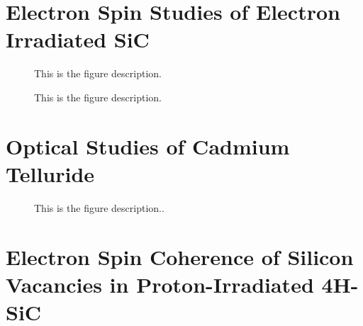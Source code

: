 \documentclass[oneside, astronomy, noacknowlegments]{BYUPhys}
\begin{document}
\begin{appendices}











\chapter{Electron Spin Studies of Electron Irradiated SiC}
\label{chpt:AppendA}

\begin{figure}
    \caption[Electron-irradiated SiC lifetime  summary]{\label{fig:e17results}
     This is the figure description.}
 \end{figure}

\begin{figure}
    \caption[ODMR/Photoluminescence vs temperature]{\label{fig:ODMRPL}
     This is the figure description.}
 \end{figure}











\chapter{Optical Studies of Cadmium Telluride}
\label{chpt:AppendB}

\begin{figure}
    \caption[Photoluminescence of CdTe]{\label{fig:CdTePL}
     This is the figure description..}
 \end{figure}









\chapter{Electron Spin Coherence of Silicon Vacancies in Proton-Irradiated 4H-SiC}
\label{chpt:AppendC}

\end{appendices}
\end{document}
